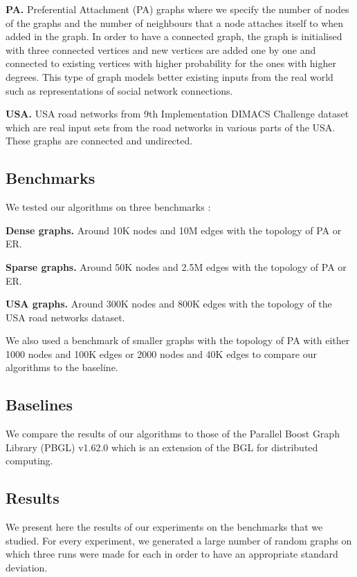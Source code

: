 \documentclass[letterpaper]{article}
\newcommand{\mypar}[1]{{\bf #1.}}
\begin{document}
\mypar{PA} Preferential Attachment (PA) graphs where we specify the number of nodes of the graphs and the number of neighbours that a node attaches itself to when added in the graph. In order to have a connected graph, the graph is initialised with three connected vertices and new vertices are added one by one and connected to existing vertices with higher probability for the ones with higher degrees. This type of graph models better existing inputs from the real world such as representations of social network connections.  

\mypar{USA} USA road networks from 9th Implementation DIMACS Challenge dataset which are real input sets from the road networks in various parts of the USA. These graphs are connected and undirected.

\subsection{Benchmarks}

We tested our algorithms on three benchmarks :

\mypar{Dense graphs} Around 10K nodes and 10M edges with the topology of PA or ER.

\mypar{Sparse graphs} Around 50K nodes and 2.5M edges with the topology of PA or ER.

\mypar{USA graphs} Around 300K nodes and 800K edges with the topology of the USA road networks dataset.


We also used a benchmark of smaller graphs with the topology of PA with either 1000 nodes and 100K edges or 2000 nodes and 40K edges to compare our algorithms to the baseline.

\subsection{Baselines} \label{sec:baseline}

We compare the results of our algorithms to those of the Parallel Boost Graph Library (PBGL) v1.62.0 which is an extension of the BGL for distributed computing.


\subsection{Results} We present here the results of our experiments on the benchmarks that we studied. For every experiment, we generated a large number of random graphs on which three runs were made for each in order to have an appropriate standard deviation.
\end{document}
